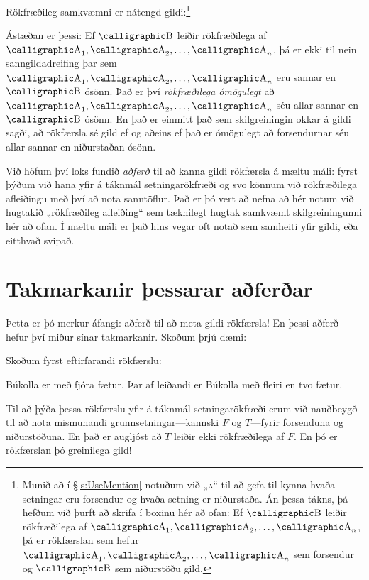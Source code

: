 Rökfræðileg samkvæmni er nátengd gildi:\footnote{Munið að í \S\ref{s:UseMention} notuðum við „$\therefore$“ til að gefa til kynna hvaða setningar eru forsendur og hvaða setning er niðurstaða. Án þessa tákns, þá hefðum við þurft að skrifa í boxinu hér að ofan: Ef $\meta{B}$ leiðir rökfræðilega af $\meta{A}_1, \meta{A}_2, \ldots, \meta{A}_n$, þá er rökfærslan sem hefur $\meta{A}_1, \meta{A}_2, \ldots, \meta{A}_n$ sem forsendur og $\meta{B}$ sem niðurstöðu gild.}


Ástæðan er þessi: Ef $\meta{B}$ leiðir rökfræðilega af $\meta{A}_1, \meta{A}_2, \ldots, \meta{A}_n$, þá er ekki til nein sanngildadreifing þar sem $\meta{A}_1, \meta{A}_2, \ldots, \meta{A}_n$ eru sannar en $\meta{B}$ ósönn. Það er því \emph{rökfræðilega ómögulegt} að $\meta{A}_1, \meta{A}_2, \ldots, \meta{A}_n$ séu allar sannar en $\meta{B}$ ósönn. En það er einmitt það sem skilgreiningin okkar á gildi sagði, að rökfærsla sé gild ef og aðeins ef það er ómögulegt að forsendurnar séu allar sannar en niðurstaðan ósönn.

Við höfum því loks fundið \emph{aðferð} til að kanna gildi rökfærsla á mæltu máli: fyrst þýðum við hana yfir á táknmál setningarökfræði og svo könnum við rökfræðilega afleiðingu með því að nota sanntöflur. Það er þó vert að nefna að hér notum við hugtakið „rökfræðileg afleiðing“ sem tæknilegt hugtak samkvæmt skilgreiningunni hér að ofan. Í mæltu máli er það hins vegar oft notað sem samheiti yfir gildi, eða eitthvað svipað.

\section{Takmarkanir þessarar aðferðar}\label{s:ParadoxesOfMaterialConditional}

Þetta er þó merkur áfangi: aðferð til að meta gildi rökfærsla! En þessi aðferð hefur því miður sínar takmarkanir. Skoðum þrjú dæmi:

Skoðum fyrst eftirfarandi rökfærslu: 
	\begin{earg}
		\item Búkolla er með fjóra fætur. Þar af leiðandi er Búkolla með fleiri en tvo fætur.
	\end{earg}
	Til að þýða þessa rökfærslu yfir á táknmál setningarökfræði erum við nauðbeygð til að nota mismunandi grunnsetningar---kannski $F$ og $T$---fyrir forsenduna og niðurstöðuna. En það er augljóst að $T$ leiðir ekki rökfræðilega af $F$. En þó er rökfærslan þó greinilega gild!
	
